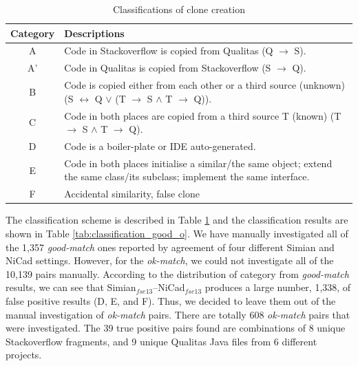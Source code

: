 \documentclass{sig-alternate-05-2015}
\begin{document}

\begin{table}
	\centering
	\caption{Classifications of clone creation}
	\label{tab:classification_scheme}
	\begin{tabular}{|c|p{13cm}|}
		\hline 
		Category & Descriptions \\ 
		\hline 
		A & Code in Stackoverflow is copied from Qualitas (Q $\rightarrow$ S). \\ 
		\hline 
		A' & Code in Qualitas is copied from Stackoverflow (S $\rightarrow$ Q). \\ 
		\hline 
		B & Code is copied either from each other or a third source (unknown) (S $\leftrightarrow$ Q $\vee$ (T $\rightarrow$ S $\wedge$ T $\rightarrow$ Q)).
		\\ 
		\hline 
		C & Code in both places are copied from a third source T (known) (T $\rightarrow$ S $\wedge$ T $\rightarrow$ Q).
		\\ 
		\hline 
		D & Code is a boiler-plate or IDE auto-generated.
		\\ 
		\hline 
		E & Code in both places initialise a similar/the same object; extend the same class/its subclass; implement the same interface.
		\\ 
		\hline 
		F & Accidental similarity, false clone \\ 
		\hline 
	\end{tabular} 
\end{table}

The classification scheme is described in Table \ref{tab:classification_scheme} and the classification results are shown in Table \ref{tab:classification_good_o}. We have manually investigated all of the 1,357 \textit{good-match} ones reported by agreement of four different Simian and NiCad settings.  However, for the \textit{ok-match}, we could not investigate all of the 10,139 pairs manually.  According to the distribution of category from \textit{good-match} results, we can see that Simian$_{fse13}$--NiCad$_{fse13}$ produces a large number, 1,338, of false positive results (D, E, and F). Thus, we decided to leave them out of the manual investigation of \textit{ok-match} pairs. There are totally 608 \textit{ok-match} pairs that were investigated. The 39 true positive pairs found are combinations of 8 unique Stackoverflow fragments, and 9 unique Qualitas Java files from 6 different projects.
\end{document}
